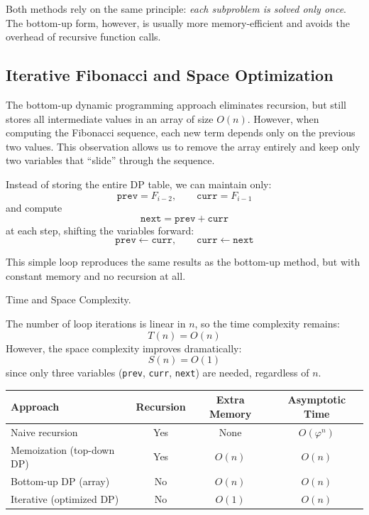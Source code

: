\documentclass{article}
\begin{document}
Both methods rely on the same principle:
\emph{each subproblem is solved only once}.
The bottom-up form, however, is usually more memory-efficient
and avoids the overhead of recursive function calls.


\subsection{Iterative Fibonacci and Space Optimization}

The bottom-up dynamic programming approach eliminates recursion,
but still stores all intermediate values in an array of size $O(n)$.
However, when computing the Fibonacci sequence, each new term depends only on the previous two values.
This observation allows us to remove the array entirely and keep only two variables that ``slide'' through the sequence.



Instead of storing the entire DP table, we can maintain only:
\[
	\texttt{prev} = F_{i-2}, \qquad \texttt{curr} = F_{i-1}
\]
and compute
\[
	\texttt{next} = \texttt{prev} + \texttt{curr}
\]
at each step, shifting the variables forward:
\[
	\texttt{prev} \leftarrow \texttt{curr}, \qquad
	\texttt{curr} \leftarrow \texttt{next}
\]

This simple loop reproduces the same results as the bottom-up method,
but with constant memory and no recursion at all.

Time and Space Complexity.

The number of loop iterations is linear in $n$,
so the time complexity remains:
\[
	T(n) = O(n)
\]
However, the space complexity improves dramatically:
\[
	S(n) = O(1)
\]
since only three variables (\texttt{prev}, \texttt{curr}, \texttt{next}) are needed, regardless of $n$.

\begin{center}
	\begin{tabular}{lccc}
		\toprule
		\textbf{Approach} & \textbf{Recursion} & \textbf{Extra Memory} & \textbf{Asymptotic Time} \\
		\midrule
		Naive recursion & Yes & None & $O(\varphi^n)$ \\
		Memoization (top-down DP) & Yes & $O(n)$ & $O(n)$ \\
		Bottom-up DP (array) & No & $O(n)$ & $O(n)$ \\
		Iterative (optimized DP) & No & $O(1)$ & $O(n)$ \\
		\bottomrule
	\end{tabular}
\end{center}
\end{document}
